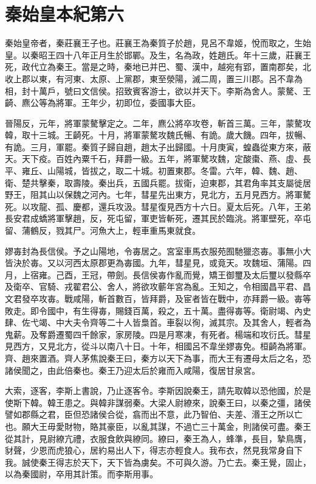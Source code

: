 \chapter{秦始皇本紀第六}

秦始皇帝者，秦莊襄王子也。莊襄王為秦質子於趙，見呂不韋姬，悅而取之，生始皇。以秦昭王四十八年正月生於邯鄲。及生，名為政，姓趙氏。年十三歲，莊襄王死，政代立為秦王。當是之時，秦地已并巴、蜀、漢中，越宛有郢，置南郡矣，北收上郡以東，有河東、太原、上黨郡，東至滎陽，滅二周，置三川郡。呂不韋為相，封十萬戶，號曰文信侯。招致賓客游士，欲以并天下。李斯為舍人。蒙驁、王齮、麃公等為將軍。王年少，初即位，委國事大臣。

晉陽反，元年，將軍蒙驁擊定之。二年，麃公將卒攻卷，斬首三萬。三年，蒙驁攻韓，取十三城。王齮死。十月，將軍蒙驁攻魏氏暢、有詭。歲大饑。四年，拔暢、有詭。三月，軍罷。秦質子歸自趙，趙太子出歸國。十月庚寅，蝗蟲從東方來，蔽天。天下疫。百姓內粟千石，拜爵一級。五年，將軍驁攻魏，定酸棗、燕、虛、長平、雍丘、山陽城，皆拔之，取二十城。初置東郡。冬雷。六年，韓、魏、趙、衛、楚共擊秦，取壽陵。秦出兵，五國兵罷。拔衛，迫東郡，其君角率其支屬徙居野王，阻其山以保魏之河內。七年，彗星先出東方，見北方，五月見西方。將軍驁死。以攻龍、孤、慶都，還兵攻汲。彗星復見西方十六日。夏太后死。八年，王弟長安君成蟜將軍擊趙，反，死屯留，軍吏皆斬死，遷其民於臨洮。將軍壁死，卒屯留、蒲鶴反，戮其尸。河魚大上，輕車重馬東就食。

嫪毐封為長信侯。予之山陽地，令毐居之。宮室車馬衣服苑囿馳獵恣毐。事無小大皆決於毐。又以河西太原郡更為毐國。九年，彗星見，或竟天。攻魏垣、蒲陽。四月，上宿雍。己酉，王冠，帶劍。長信侯毐作亂而覺，矯王御璽及太后璽以發縣卒及衛卒、官騎、戎翟君公、舍人，將欲攻蘄年宮為亂。王知之，令相國昌平君、昌文君發卒攻毐。戰咸陽，斬首數百，皆拜爵，及宦者皆在戰中，亦拜爵一級。毐等敗走。即令國中，有生得毐，賜錢百萬，殺之，五十萬。盡得毐等。衛尉竭、內史肆、佐弋竭、中大夫令齊等二十人皆梟首。車裂以徇，滅其宗。及其舍人，輕者為鬼薪。及奪爵遷蜀四千餘家，家房陵。四是月寒凍，有死者。楊端和攻衍氏。彗星見西方，又見北方，從斗以南八十日。十年，相國呂不韋坐嫪毐免。桓齮為將軍。齊、趙來置酒。齊人茅焦說秦王曰，秦方以天下為事，而大王有遷母太后之名，恐諸侯聞之，由此倍秦也。秦王乃迎太后於雍而入咸陽，復居甘泉宮。

大索，逐客，李斯上書說，乃止逐客令。李斯因說秦王，請先取韓以恐他國，於是使斯下韓。韓王患之。與韓非謀弱秦。大梁人尉繚來，說秦王曰，以秦之彊，諸侯譬如郡縣之君，臣但恐諸侯合從，翕而出不意，此乃智伯、夫差、湣王之所以亡也。願大王毋愛財物，賂其豪臣，以亂其謀，不過亡三十萬金，則諸侯可盡。秦王從其計，見尉繚亢禮，衣服食飲與繚同。繚曰，秦王為人，蜂準，長目，摯鳥膺，豺聲，少恩而虎狼心，居約易出人下，得志亦輕食人。我布衣，然見我常身自下我。誠使秦王得志於天下，天下皆為虜矣。不可與久游。乃亡去。秦王覺，固止，以為秦國尉，卒用其計策。而李斯用事。

